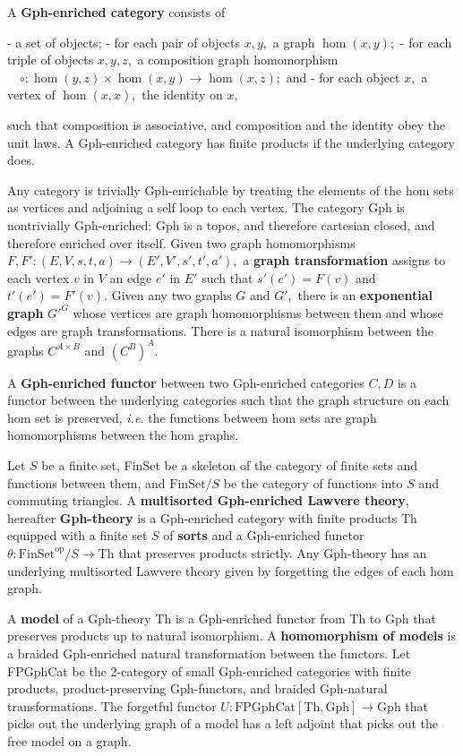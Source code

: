\documentclass[a4paper,UKenglish]{article}
\newcommand{\Th}{\mathrm{Th}}
\newcommand{\Gph}{\mathrm{Gph}}
\newcommand{\FinSet}{\mathrm{FinSet}}
\newcommand{\op}{\mathrm{op}}
\begin{document}
A {\bf Gph-enriched category} consists of

- a set of objects;
- for each pair of objects $x, y,$ a graph $\hom(x,y);$
- for each triple of objects $x, y, z,$ a composition graph homomorphism
  $\quad \circ\colon \hom(y, z) \times \hom(x, y) \to \hom(x, z);$ and
- for each object $x,$ a vertex of $\hom(x, x),$ the identity on $x,$

such that composition is associative, and composition and the identity obey the unit laws.  A Gph-enriched category has finite products if the underlying category does.

Any category is trivially Gph-enrichable by treating the elements of the hom sets as vertices and adjoining a self loop to each vertex. The category Gph is nontrivially Gph-enriched: Gph is a topos, and therefore cartesian closed, and therefore enriched over itself.  Given two graph homomorphisms $F, F'\colon (E, V, s, t, a) \to (E', V', s', t', a'),$ a {\bf graph transformation} assigns to each vertex $v$ in $V$ an edge $e'$ in $E'$ such that $s'(e') = F(v)$ and $t'(e') = F'(v).$ Given any two graphs $G$ and $G',$ there is an {\bf exponential graph} $G'^G$ whose vertices are graph homomorphisms between them and whose
edges are graph transformations.  There is a natural isomorphism between the graphs $C^{A\times B}$ and $(C^B)^A.$

A {\bf Gph-enriched functor} between two Gph-enriched categories $C, D$ is a functor between the underlying categories such that the graph structure on each hom set is preserved, {\em i.e.} the functions between hom sets are graph homomorphisms between the hom graphs.

Let $S$ be a finite set, FinSet be a skeleton of the category of finite sets and functions between them, and $\mbox{FinSet}/S$ be the category of functions into $S$ and commuting triangles.  A {\bf multisorted Gph-enriched Lawvere theory}, hereafter {\bf Gph-theory}
is a Gph-enriched category with finite products Th equipped with a finite set $S$ of {\bf sorts} and a Gph-enriched functor $\theta\colon \FinSet^\op/S \to \Th$ that preserves products
strictly.  Any Gph-theory has an underlying multisorted Lawvere theory given by forgetting the edges of each hom graph.

A {\bf model} of a Gph-theory Th is a Gph-enriched functor from Th to Gph that preserves products up to natural isomorphism.  A {\bf homomorphism of models} is a braided Gph-enriched natural transformation between the functors.  Let FPGphCat be the 2-category of small Gph-enriched categories with finite products, product-preserving Gph-functors, and braided Gph-natural transformations.  The forgetful functor $U\colon \mbox{FPGphCat}[\Th, \Gph] \to \Gph$ that picks out the underlying
graph of a model has a left adjoint that picks out the free model on a graph.
\end{document}
